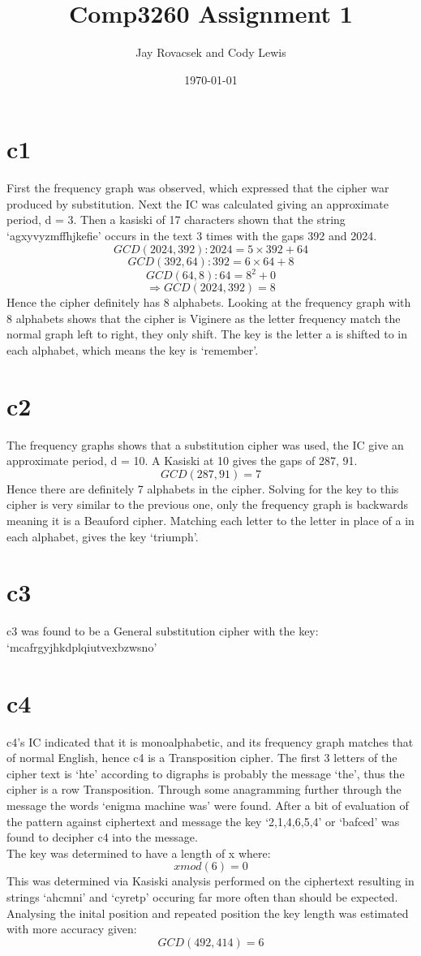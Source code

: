 \documentclass{article}
\title{Comp3260 Assignment 1}
\author{Jay Rovacsek and Cody Lewis}
\date{\today}
\begin{document}
  
    \maketitle
  
    \section{c1}
      First the frequency graph was observed, which expressed that the cipher
      war produced by substitution. Next the IC was calculated giving an 
      approximate period, d = 3. Then a kasiski of 17 characters shown that the
      string `agxyvyzmffhjkefie' occurs in the text 3 times with the gaps
      392 and 2024.
        \[ GCD(2024,392): 2024 = 5 \times 392 + 64 \] 
        \[ GCD(392,64): 392 = 6 \times 64 + 8 \] 
        \[ GCD(64,8): 64 = 8^2 + 0 \] 
        \[ \Rightarrow GCD(2024,392) = 8 \] 
      Hence the cipher definitely has 8 alphabets. Looking at the frequency 
      graph with 8 alphabets shows that the cipher is Viginere as the letter 
      frequency match the normal graph left to right, they only shift. The 
      key is the letter a is shifted to in each alphabet, which means the key 
      is `remember'.
    \section{c2}
      The frequency graphs shows that a substitution cipher was used, the IC
      give an approximate period, d = 10. A Kasiski at 10 gives the gaps of 287,
      91.
        \[ GCD(287,91) = 7 \]
      Hence there are definitely 7 alphabets in the cipher. Solving for the key
      to this cipher is very similar to the previous one, only the frequency 
      graph is backwards meaning it is a Beauford cipher. Matching each letter
      to the letter in place of a in each alphabet, gives the key `triumph'.
    \section{c3}
      c3 was found to be a General substitution cipher with the key: `mcafrgyjhkdplqiutvexbzwsno'
    \section{c4}
      c4's IC indicated that it is monoalphabetic, and its frequency graph matches that
      of normal English, hence c4 is a Transposition cipher. The first 3 letters of the
      cipher text is `hte' according to digraphs is probably the message `the', thus the
      cipher is a row Transposition. Through some anagramming further through the message 
      the words `enigma machine was' were found. After a bit of evaluation of the pattern 
      against ciphertext and message the key `2,1,4,6,5,4' or `bafced' was found to decipher 
      c4 into the message. \\
      The key was determined to have a length of x where: \[x mod (6) = 0\]
      This was determined via Kasiski analysis performed on the ciphertext resulting in strings 
      `ahcmni' and `cyretp' occuring far more often than should be expected.
      Analysing the inital position and repeated position the key length was estimated
      with more accuracy given: \[ GCD(492,414) = 6 \]
  
\end{document}
